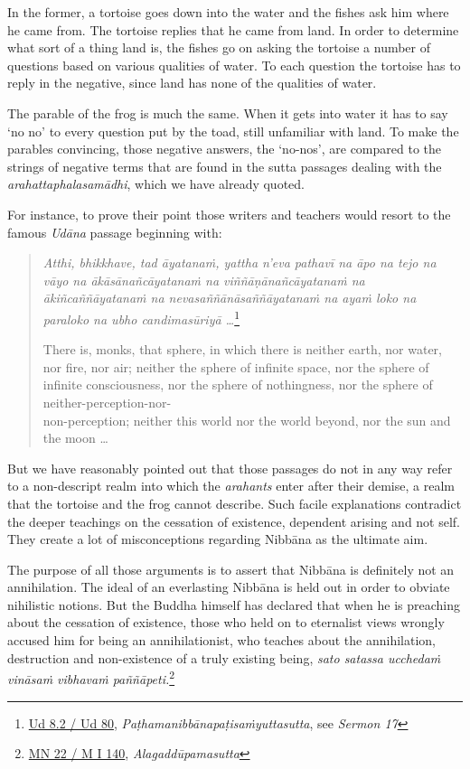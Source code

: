 In the former, a tortoise goes down into the water and the fishes ask him where he came from. The tortoise replies that he came from land. In order to determine what sort of a thing land is, the fishes go on asking the tortoise a number of questions based on various qualities of water. To each question the tortoise has to reply in the negative, since land has none of the qualities of water.

The parable of the frog is much the same. When it gets into water it has to say `no no' to every question put by the toad, still unfamiliar with land. To make the parables convincing, those negative answers, the `no-nos', are compared to the strings of negative terms that are found in the sutta passages dealing with the \emph{arahattaphalasamādhi}, which we have already quoted.

For instance, to prove their point those writers and teachers would resort to the famous \emph{Udāna} passage beginning with:

\begin{quote}
\emph{Atthi, bhikkhave, tad āyatanaṁ, yattha n'eva pathavī na āpo na tejo na vāyo na ākāsānañcāyatanaṁ na viññāṇānañcāyatanaṁ na ākiñcaññāyatanaṁ na nevasaññānāsaññāyatanaṁ na ayaṁ loko na paraloko na ubho candimasūriyā \ldots{}}\footnote{\href{https://suttacentral.net/ud8.2/pli/ms}{Ud 8.2 / Ud 80}, \emph{Paṭhamanibbānapaṭisaṁyuttasutta}, see \emph{Sermon 17}}

There is, monks, that sphere, in which there is neither earth, nor water, nor fire, nor air; neither the sphere of infinite space, nor the sphere of infinite consciousness, nor the sphere of nothingness, nor the sphere of neither-perception-nor-\\ non-perception; neither this world nor the world beyond, nor the sun and the moon \ldots{}
\end{quote}

But we have reasonably pointed out that those passages do not in any way refer to a non-descript realm into which the \emph{arahants} enter after their demise, a realm that the tortoise and the frog cannot describe. Such facile explanations contradict the deeper teachings on the cessation of existence, dependent arising and not self. They create a lot of misconceptions regarding Nibbāna as the ultimate aim.

The purpose of all those arguments is to assert that Nibbāna is definitely not an annihilation. The ideal of an everlasting Nibbāna is held out in order to obviate nihilistic notions. But the Buddha himself has declared that when he is preaching about the cessation of existence, those who held on to eternalist views wrongly accused him for being an annihilationist, who teaches about the annihilation, destruction and non-existence of a truly existing being, \emph{sato satassa ucchedaṁ vināsaṁ vibhavaṁ paññāpeti.}\footnote{\href{https://suttacentral.net/mn22/pli/ms}{MN 22 / M I 140}, \emph{Alagaddūpamasutta}}

